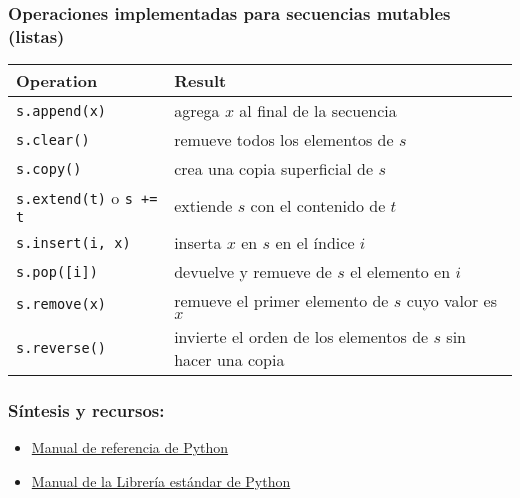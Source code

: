 \documentclass{beamer}
\begin{document}
\begin{frame}[fragile]
    \frametitle{Operaciones implementadas para secuencias mutables (listas)}
{\small
    \begin{table}[]
    \begin{tabular}{@{}ll@{}}
    \toprule
    \textbf{Operation}    & \textbf{Result}                                                                          \\ \midrule
    \texttt{s.append(x)}           & agrega $x$ al final de la secuencia            \\
    \texttt{s.clear()}             & remueve todos los elementos de $s$                                          \\
    \texttt{s.copy()}              & crea una copia \alert{superficial} de $s$                                          \\
    \texttt{s.extend(t)} o \texttt{s += t} & extiende $s$ con el contenido de $t$  \\
    \texttt{s.insert(i, x)}        & inserta $x$ en $s$ en el índice $i$                  \\
    \texttt{s.pop([i])}            & devuelve y remueve de $s$ el elemento en $i$         \\ 
    \texttt{s.remove(x)}           & remueve el primer elemento de $s$ cuyo valor es $x$                                \\
    \texttt{s.reverse()}           & invierte el orden de los elementos de $s$ sin hacer una copia                                                        
    \end{tabular}
    \end{table}
}  

\end{frame}

\begin{frame}
\frametitle{Síntesis y recursos:}

\begin{itemize}
    \item \href{https://docs.python.org/3/reference/index.html}{Manual de referencia de Python}
    \item \href{https://docs.python.org/3/library/index.html}{Manual de la Librería estándar de Python}
\end{itemize}
\end{frame}
\end{document}
